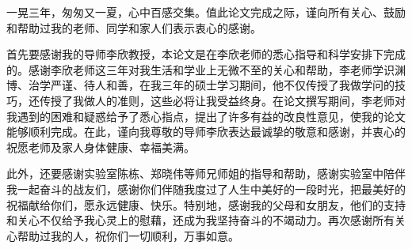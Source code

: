 \begin{acknowledgement}
 一晃三年，匆匆又一夏，心中百感交集。值此论文完成之际，谨向所有关心、鼓励和帮助过我的老师、同学和家人们表示衷心的感谢。
 
首先要感谢我的导师李欣教授，本论文是在李欣老师的悉心指导和科学安排下完成的。感谢李欣老师这三年对我生活和学业上无微不至的关心和帮助，李老师学识渊博、治学严谨、待人和善，在我三年的硕士学习期间，他不仅传授了我做学问的技巧，还传授了我做人的准则，这些必将让我受益终身。在论文撰写期间，李老师对我遇到的困难和疑惑给予了悉心指点，提出了许多有益的改良性意见，使我的论文能够顺利完成。在此，谨向我尊敬的导师李欣表达最诚挚的敬意和感谢，并衷心的祝愿老师及家人身体健康、幸福美满。

此外，还要感谢实验室陈栋、郑晓伟等师兄师姐的指导和帮助，感谢实验室中陪伴我一起奋斗的战友们，感谢你们伴随我度过了人生中美好的一段时光，把最美好的祝福献给你们，愿永远健康、快乐。特别地，感谢我的父母和女朋友，他们的支持和关心不仅给予我心灵上的慰藉，还成为我坚持奋斗的不竭动力。再次感谢所有关心帮助过我的人，祝你们一切顺利，万事如意。


\end{acknowledgement}
